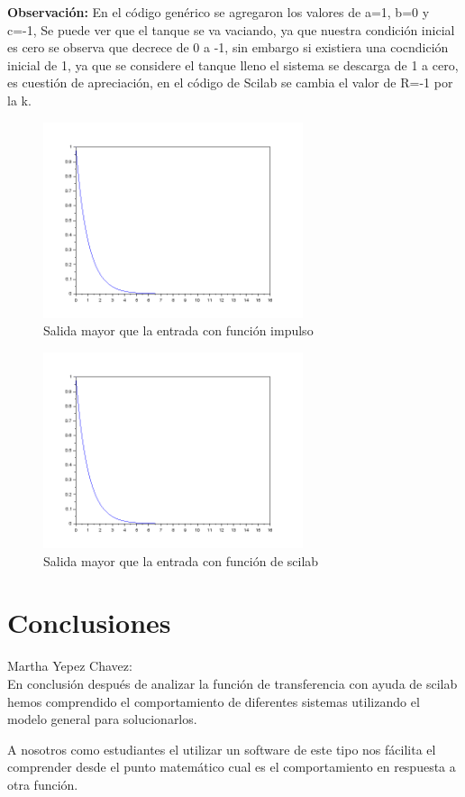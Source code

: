 \documentclass[12pt,letterpaper]{article}     %
\begin{document}
\textbf{Observación:}
En el código genérico se agregaron los valores de a=1, b=0 y c=-1,
Se puede ver que el tanque se va vaciando, ya que nuestra condición inicial es cero se observa que decrece de 0 a -1, sin embargo si existiera una cocndición inicial de 1, ya que se considere el tanque lleno el sistema se descarga de 1 a cero, es cuestión de apreciación, en el código de Scilab se cambia el valor de R=-1 por la k.\\
\begin{figure}[h!]
\centering
\includegraphics[width=3in]{5}
\caption{Salida mayor que la entrada con función impulso}
\end{figure}
\begin{figure}[h!]
\centering
\includegraphics[width=3in]{8}
\caption{Salida mayor que la entrada con función de scilab}
\end{figure}

\newpage
\section{Conclusiones}
Martha Yepez Chavez:\\
 En conclusión  después de analizar la función de transferencia con ayuda de scilab  hemos comprendido el comportamiento de diferentes sistemas utilizando el modelo general para solucionarlos.

A nosotros como estudiantes el utilizar un software de este tipo nos fácilita el comprender desde el punto matemático cual es el comportamiento en respuesta a otra función.
\end{document}

